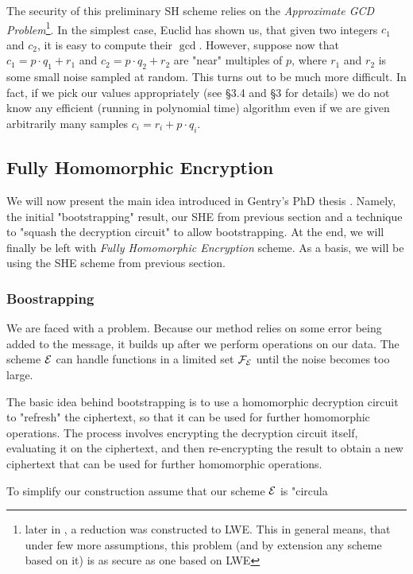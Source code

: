 The security of this preliminary SH scheme relies on the \textit{Approximate GCD Problem}\footnote{later in \cite{revisited}, a reduction was constructed to LWE. This in general means, that under few more assumptions, this problem (and by extension any scheme based on it) is as secure as one based on LWE}. In the simplest case, Euclid has shown us, that given two integers $c_1$ and $c_2$, it is easy to compute their $\gcd$. However, suppose now that $c_1 = p \cdot q_1 + r_1$ and $c_2 = p \cdot q_2 + r_2$ are "near" multiples of $p$, where $r_1$ and $r_2$ is some small noise sampled at random. This turns out to be much more difficult. In fact, if we pick our values appropriately (see \cite{easy_fhe} \S 3.4 and \cite{int_scheme} \S 3 for details) we do not know any efficient (running in polynomial time) algorithm even if we are given arbitrarily many samples $c_i = r_i + p \cdot q_i$. \\

\subsection{Fully Homomorphic Encryption}
We will now present the main idea introduced in Gentry's PhD thesis \cite{gentry_phd}. Namely, the initial "bootstrapping" result, our SHE from previous section and a technique to "squash the decryption circuit" to allow bootstrapping. At the end, we will finally be left with \textit{Fully Homomorphic Encryption} scheme. As a basis, we will be using the SHE scheme from previous section.

\subsubsection*{Boostrapping}
We are faced with a problem. Because our method relies on some error being added to the message, it builds up after we perform operations on our data. The scheme $\mathcal{E}$ can handle functions in a limited set $\mathcal{F}_{\mathcal{E}}$ until the noise becomes too large.

The basic idea behind bootstrapping is to use a homomorphic decryption circuit to "refresh" the ciphertext, so that it can be used for further homomorphic operations. The process involves encrypting the decryption circuit itself, evaluating it on the ciphertext, and then re-encrypting the result to obtain a new ciphertext that can be used for further homomorphic operations.

To simplify our construction assume that our scheme $\mathcal{E}$ is "circula
